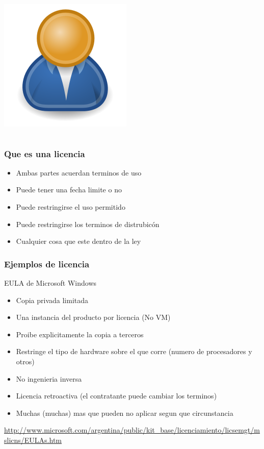 \documentclass[11pt]{beamer}
\begin{document}
\begin{frame}
\begin{columns}
\begin{center}
\includegraphics[scale=0.3]{images/User1_icon.png}
\end{center}

\end{columns}
\end{frame}

\begin{frame}
\frametitle{Que es una licencia}
\begin{itemize}[<+-| alert@+>]
\item Ambas partes acuerdan terminos de uso
\item Puede tener una fecha limite o no
\item Puede restringirse el uso permitido
\item Puede restringirse los terminos de distrubicón
\item Cualquier cosa que este dentro de la ley
\end{itemize}
\end{frame}

\begin{frame}
\frametitle{Ejemplos de licencia}
\begin{block}{EULA de Microsoft Windows}
\begin{itemize}[<+-| alert@+>]
\item Copia privada limitada
\item Una instancia del producto por licencia (No VM)
\item Proibe explicitamente la copia a terceros
\item Restringe el tipo de hardware sobre el que corre (numero de procesadores y otros)
\item No ingenieria inversa
\item Licencia retroactiva (el contratante puede cambiar los terminos)
\item Muchas (muchas) mas que pueden no aplicar segun que circunstancia
\end{itemize}
\end{block}
\pause
\url{http://www.microsoft.com/argentina/public/kit_base/licenciamiento/licsemgt/mslicns/EULAs.htm}
\end{frame}
\end{document}
